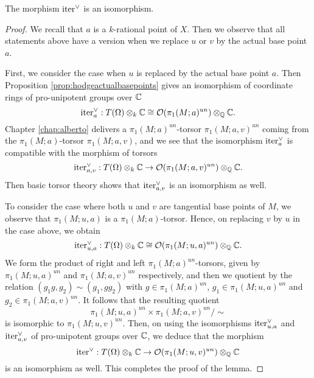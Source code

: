 \begin{lemma}
The morphism $\mathrm{iter}^{\vee}$ is an isomorphism.
\end{lemma}
\begin{proof}
We recall that $a$ is a $k$-rational point of $X$. Then we observe that all statements above have a version when we replace $u$ or $v$ by the actual base point $a$.

First, we consider the case when $u$ is replaced by the actual base point $a$.
Then Proposition \ref{prop:hodgeactualbasepoints} gives an isomorphism  of coordinate rings of pro-unipotent groups over $\mathbb{C}$
\begin{equation*}
\mathrm{iter}^{\vee}_a: T(\Omega)\otimes_k\mathbb{C}\cong \mathcal{O}(\pi_1(M;a)^{un})\otimes_{\mathbb{Q}}\mathbb{C}.
\end{equation*}
Chapter \ref{chap:alberto} delivers a  $\pi_1(M;a)^{un}$-torsor $\pi_1(M;a,v)^{un}$  coming from the $\pi_1(M;a)$-torsor $\pi_1(M;a,v)$,
and we see that the isomorphism $\mathrm{iter}^{\vee}_a$ is compatible with the morphism of torsors
\begin{equation*}
\mathrm{iter}^{\vee}_{a,v}:  T(\Omega)\otimes_k\mathbb{C}\to \mathcal{O}(\pi_1(M;a,v)^{un})\otimes_{\mathbb{Q}}\mathbb{C}.
\end{equation*}
Then basic torsor theory shows that $\mathrm{iter}^{\vee}_{a,v}$ is  an isomorphism as well. 

To consider the case where both $u$ and $v$ are tangential base points of $M$, we observe that $\pi_1(M;u,a)$ is a $\pi_1(M;a)$-torsor. Hence, on  replacing $v$ by $u$ in the case above, we obtain
\begin{equation*}
\mathrm{iter}^{\vee}_{u,a}: T(\Omega)\otimes_k\mathbb{C}\cong \mathcal{O}(\pi_1(M;u,a)^{un})\otimes_{\mathbb{Q}}\mathbb{C}.
\end{equation*}
We form the product of right and left $\pi_1(M;a)^{un}$-torsors, given by  $\pi_1(M;u,a)^{un}$ and $\pi_1(M;a,v)^{un}$ respectively, and then we quotient by the relation $(g_1g,g_2) \sim (g_1,gg_2)$ with $g\in \pi_1(M;a)^{un}$, $g_1\in \pi_1(M;u,a)^{un}$ and $g_2\in\pi_1(M;a,v)^{un}$. 
It follows that the resulting quotient
$$
\pi_1(M;u,a)^{un} \times \pi_1(M;a,v)^{un}/ \sim
$$
is isomorphic to $\pi_1(M;u,v)^{un}$.
Then, on using the isomorphisms $\mathrm{iter}^{\vee}_{u,a}$ and  $\mathrm{iter}^{\vee}_{a,v}$ of pro-unipotent groups over $\mathbb{C}$, we deduce that the morphism
\begin{equation*}
\mathrm{iter}^\vee:  T(\Omega)\otimes_k\mathbb{C}\to \mathcal{O}(\pi_1(M;u,v)^{un})\otimes_{\mathbb{Q}}\mathbb{C}
\end{equation*}
is an isomorphism as well. This completes the proof of the lemma.
\end{proof}

